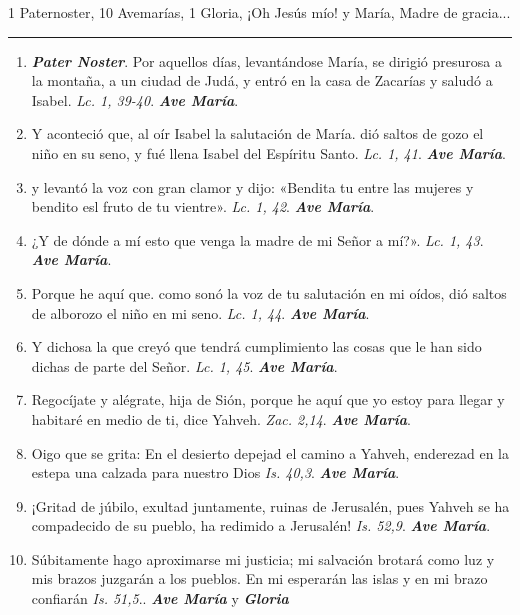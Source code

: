 \documentclass[11pt,a4paper]{book}
\begin{document}
    1 Paternoster, 10 Avemarías, 1 Gloria, ¡Oh Jesús mío! y María, Madre de gracia...
    
    \rule{\textwidth}{0.5pt}

    \begin{enumerate}
        
        \item \textbf{\emph{Pater Noster}}. Por aquellos días, levantándose María, se dirigió presurosa a la montaña, a un ciudad de Judá, 
            y entró en la casa de Zacarías y saludó a Isabel. \emph{Lc. 1, 39-40}. \textbf{\emph{Ave María}}.

        \item Y aconteció que, al oír Isabel la salutación de María. dió saltos de gozo el niño en su seno, 
            y fué llena Isabel del Espíritu Santo. \emph{Lc. 1, 41}. \textbf{\emph{Ave María}}.

        \item y levantó la voz con gran clamor y dijo: «Bendita tu entre las mujeres y bendito esl fruto de tu vientre». \emph{Lc. 1, 42}. \textbf{\emph{Ave María}}.

        \item ¿Y de dónde a mí esto que venga la madre de mi Señor a mí?». \emph{Lc. 1, 43}. \textbf{\emph{Ave María}}.

        \item Porque he aquí que. como sonó la voz de tu salutación en mi oídos, dió saltos de alborozo el niño en mi seno. \emph{Lc. 1, 44}. \textbf{\emph{Ave María}}.

        \item Y dichosa la que creyó que tendrá cumplimiento las cosas que le han sido dichas de parte del Señor. \emph{Lc. 1, 45}. \textbf{\emph{Ave María}}.

        \item Regocíjate y alégrate, hija de Sión, porque he aquí que yo estoy para llegar y habitaré en medio de ti, dice Yahveh. \emph{Zac. 2,14}. \textbf{\emph{Ave María}}.

        \item Oigo que se grita: En el desierto depejad el camino a Yahveh, enderezad en la estepa una calzada para nuestro Dios \emph{Is. 40,3}. \textbf{\emph{Ave María}}.

        \item ¡Gritad de júbilo, exultad juntamente, ruinas de Jerusalén, pues Yahveh se ha compadecido de su pueblo, 
            ha redimido a Jerusalén! \emph{Is. 52,9}. \textbf{\emph{Ave María}}.

        \item Súbitamente hago aproximarse mi justicia; mi salvación brotará como luz y mis brazos juzgarán a los pueblos. 
            En mi esperarán las islas y en mi brazo confiarán \emph{Is. 51,5}.. \textbf{\emph{Ave María}} y \textbf{\emph{Gloria}}

    \end{enumerate}    
\end{document}
